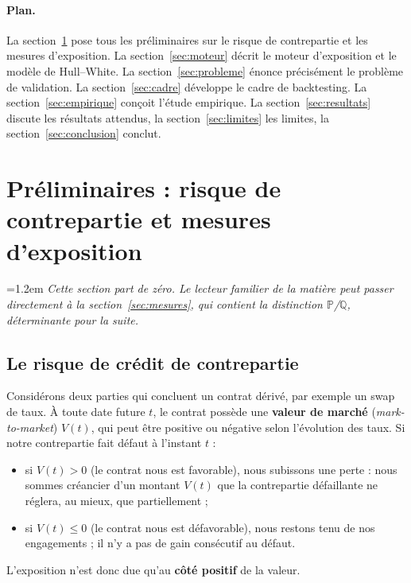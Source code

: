 \documentclass[11pt,a4paper]{article}
\newcommand{\Prob}{\mathbb{P}}
\newcommand{\Qmeas}{\mathbb{Q}}
\newenvironment{remarque}
  {\par\smallskip\noindent\begin{minipage}{\linewidth}\leftskip=1.2em
   \footnotesize\itshape}
  {\end{minipage}\par\smallskip}
\theoremstyle{remark}
\begin{document}
\paragraph{Plan.} La section~\ref{sec:prelim} pose tous les préliminaires sur le risque de contrepartie et les mesures d'exposition. La section~\ref{sec:moteur} décrit le moteur d'exposition et le modèle de Hull--White. La section~\ref{sec:probleme} énonce précisément le problème de validation. La section~\ref{sec:cadre} développe le cadre de backtesting. La section~\ref{sec:empirique} conçoit l'étude empirique. La section~\ref{sec:resultats} discute les résultats attendus, la section~\ref{sec:limites} les limites, la section~\ref{sec:conclusion} conclut.

\section{Préliminaires : risque de contrepartie et mesures d'exposition}
\label{sec:prelim}

\begin{remarque}
Cette section part de zéro. Le lecteur familier de la matière peut passer directement à la section~\ref{sec:mesures}, qui contient la distinction $\Prob$/$\Qmeas$, déterminante pour la suite.
\end{remarque}

\subsection{Le risque de crédit de contrepartie}

Considérons deux parties qui concluent un contrat dérivé, par exemple un swap de taux. À toute date future $t$, le contrat possède une \textbf{valeur de marché} (\emph{mark-to-market}) $V(t)$, qui peut être positive ou négative selon l'évolution des taux. Si notre contrepartie fait défaut à l'instant $t$ :
\begin{itemize}[nosep]
  \item si $V(t) > 0$ (le contrat nous est favorable), nous subissons une perte : nous sommes créancier d'un montant $V(t)$ que la contrepartie défaillante ne réglera, au mieux, que partiellement ;
  \item si $V(t) \le 0$ (le contrat nous est défavorable), nous restons tenu de nos engagements ; il n'y a pas de gain consécutif au défaut.
\end{itemize}
L'exposition n'est donc due qu'au \textbf{côté positif} de la valeur.
\end{document}
